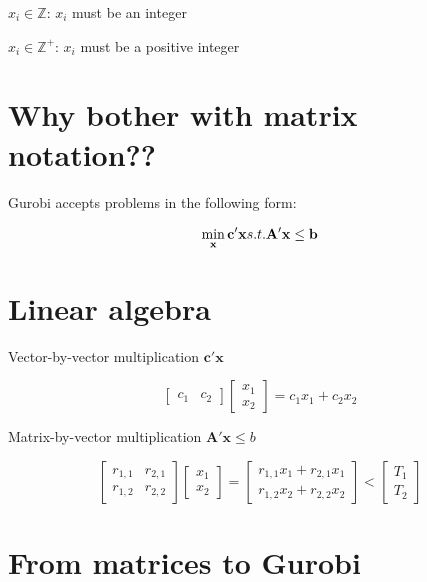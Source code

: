 \documentclass[
]{article}
\begin{document}
\(x_i \in \mathbb{Z}\): \(x_i\) must be an integer

\(x_i \in \mathbb{Z}^+\): \(x_i\) must be a positive integer

\hypertarget{why-bother-with-matrix-notation}{%
\section{Why bother with matrix
notation??}\label{why-bother-with-matrix-notation}}

Gurobi accepts problems in the following form:

\[
\min_\mathbf{x} \mathbf{c'x} \\
s.t. \mathbf{A'x} \leq \mathbf{b}
\]

\hypertarget{linear-algebra}{%
\section{Linear algebra}\label{linear-algebra}}

Vector-by-vector multiplication \(\mathbf{c'x}\)

\[
\begin{bmatrix}
c_1 & c_2
\end{bmatrix}
\begin{bmatrix}
x_1 \\
x_2
\end{bmatrix}
=
c_1x_1 + c_2x_2
\]

Matrix-by-vector multiplication \(\mathbf{A'x}\leq b\)

\[
\begin{bmatrix}
r_{1,1} & r_{2,1} \\
r_{1,2} & r_{2,2}
\end{bmatrix}
\begin{bmatrix}
x_1 \\
x_2
\end{bmatrix}
=
\begin{bmatrix}
r_{1,1}x_1 + r_{2,1}x_1 \\
r_{1,2}x_2 + r_{2,2}x_2
\end{bmatrix}
< 
\begin{bmatrix}
T_1 \\
T_2
\end{bmatrix}
\]

\hypertarget{from-matrices-to-gurobi}{%
\section{From matrices to Gurobi}\label{from-matrices-to-gurobi}}
\end{document}
